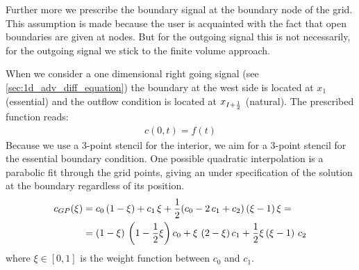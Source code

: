 Further more we prescribe the boundary signal at the boundary node of the grid.
This assumption is made because the user is acquainted with the fact that open boundaries are given at nodes.
But for the outgoing signal this is not necessarily, for the outgoing signal we stick to the finite volume approach.

When we consider a one dimensional right going signal (see \autoref{sec:1d_adv_diff_equation}) the boundary at the west side is located at $x_1$ (essential) and the outflow condition is located at $x_{I+\frac{1}{2}}$ (natural).
The prescribed function reads:
\begin{align}
    c(0,t) = f(t)
\end{align}
Because we use a 3-point stencil for the interior, we aim for a 3-point stencil for the essential boundary condition.
One possible quadratic interpolation is a parabolic fit through the grid points, giving an under specification of the solution at the boundary regardless of its position.
\begin{align}
    c_{GP}(\xi) & = c_0 \,  (1 - \xi) + c_1 \,  \xi + \frac{1}{2}(c_0 - 2\, c_1 + c_2) \,  (\xi - 1) \,  \xi
    =
    \nonumber \\
    & =  \left(1 - \xi\right) \,  \left(1 - \frac{1}{2} \xi\right) c_0  + \xi \,  \left(2 - \xi\right) c_1 + \frac{1}{2} \xi  \left(\xi - 1\right) \,  c_2
    \label{eq:20231214-1}
\end{align}
where $\xi\in [0,1]$ is the weight function between $c_0$ and $c_1$.

